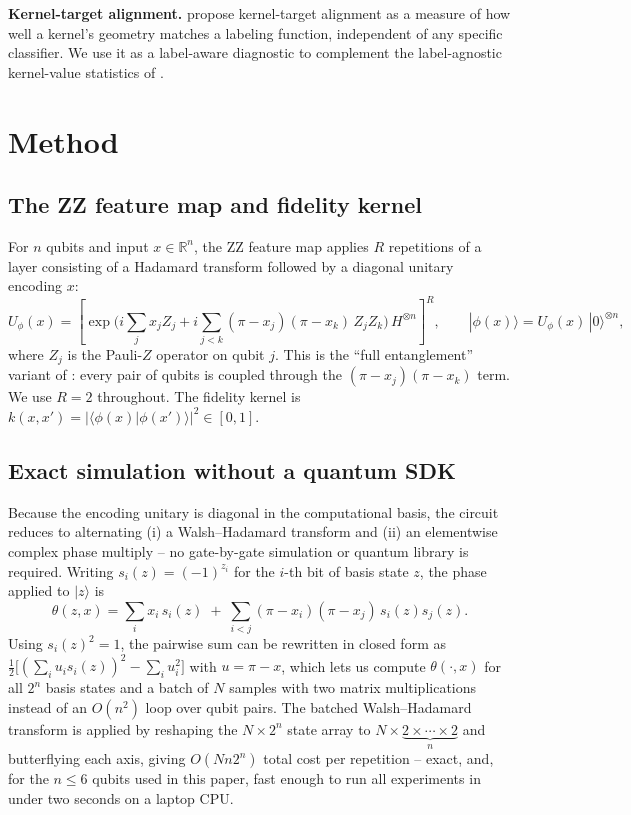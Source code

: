 \documentclass{article}
\begin{document}
\textbf{Kernel-target alignment.} \citet{cristianini2001kernel} propose
kernel-target alignment as a measure of how well a kernel's geometry matches
a labeling function, independent of any specific classifier. We use it as a
label-aware diagnostic to complement the label-agnostic kernel-value
statistics of \citet{thanasilp2024exponential}.

\section{Method}
\label{sec:method}

\subsection{The ZZ feature map and fidelity kernel}

For $n$ qubits and input $x \in \mathbb{R}^n$, the ZZ feature map applies
$R$ repetitions of a layer consisting of a Hadamard transform followed by a
diagonal unitary encoding $x$:
\[
U_\phi(x) = \left[ \exp\!\Big(i \sum_{j} x_j Z_j + i\!\!\sum_{j<k}\!(\pi -
x_j)(\pi - x_k)\, Z_j Z_k\Big)\, H^{\otimes n} \right]^{R},
\qquad |\phi(x)\rangle = U_\phi(x)\,|0\rangle^{\otimes n},
\]
where $Z_j$ is the Pauli-$Z$ operator on qubit $j$. This is the ``full
entanglement'' variant of \citet{havlicek2019supervised}: every pair of
qubits is coupled through the $(\pi - x_j)(\pi - x_k)$ term. We use $R=2$
throughout. The fidelity kernel is
$k(x, x') = |\langle \phi(x) | \phi(x') \rangle|^2 \in [0, 1]$.

\subsection{Exact simulation without a quantum SDK}

Because the encoding unitary is diagonal in the computational basis, the
circuit reduces to alternating (i) a Walsh--Hadamard transform and (ii) an
elementwise complex phase multiply -- no gate-by-gate simulation or quantum
library is required. Writing $s_i(z) = (-1)^{z_i}$ for the $i$-th bit of
basis state $z$, the phase applied to $|z\rangle$ is
\[
\theta(z, x) = \sum_i x_i\, s_i(z) \;+\; \sum_{i<j} (\pi - x_i)(\pi -
x_j)\, s_i(z) s_j(z).
\]
Using $s_i(z)^2 = 1$, the pairwise sum can be rewritten in closed form as
$\tfrac{1}{2}\big[(\sum_i u_i s_i(z))^2 - \sum_i u_i^2\big]$ with $u = \pi -
x$, which lets us compute $\theta(\cdot, x)$ for all $2^n$ basis states and a
batch of $N$ samples with two matrix multiplications instead of an
$O(n^2)$ loop over qubit pairs. The batched Walsh--Hadamard transform is
applied by reshaping the $N \times 2^n$ state array to $N \times
\underbrace{2 \times \cdots \times 2}_{n}$ and butterflying each axis, giving
$O(N n 2^n)$ total cost per repetition -- exact, and, for the $n \le 6$
qubits used in this paper, fast enough to run all experiments in under two
seconds on a laptop CPU.
\end{document}
